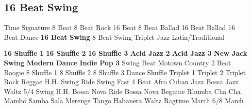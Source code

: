 \subsection{16 Beat Swing}
Time Signature
8 Beat
8 Beat Rock
16 Beat
8 Beat Ballad
16 Beat Ballad
16 Beat Dance
\textbf{16 Beat Swing}
8 Beat Swing
Triplet
Jazz
Latin/Traditional





























\textbf{16 Shuffle 1}
\textbf{16 Shuffle 2}
\textbf{16 Shuffle 3}
\textbf{Acid Jazz 2}
\textbf{Acid Jazz 3}
\textbf{New Jack Swing}
\textbf{Modern Dance}
\textbf{Indie Pop 3}
Swing Beat
Motown
Country 2 Beat
Boogie
8 Shuffle 1
8 Shuffle 2
8 Shuffle 3
Dance Shuffle
Triplet 1
Triplet 2
Triplet Rock
Reggae
H.H. Swing
Ride Swing
Fast 4 Beat
Afro Cuban
Jazz Bossa
Jazz Waltz
5/4 Swing
H.H. Bossa Nova
Ride Bossa Nova
Beguine
Rhumba
Cha Cha
Mambo
Samba
Sala
Merenge
Tango
Habanera
Waltz
Ragtime
March
6/8 March
